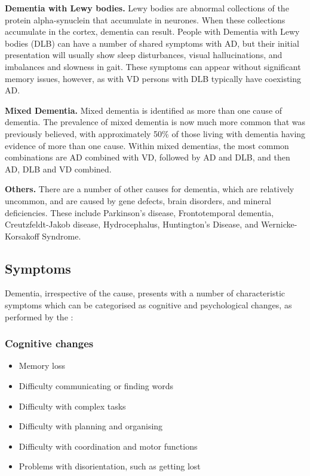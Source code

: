 \textbf{Dementia with Lewy bodies.}
Lewy bodies are abnormal collections of the protein alpha-synuclein that accumulate in neurones. When these collections accumulate in the cortex, dementia can result. People with Dementia with Lewy bodies (DLB) can have a number of shared symptoms with AD, but their initial presentation will usually show sleep disturbances, visual hallucinations, and imbalances and slowness in gait. These symptoms can appear without significant memory issues, however, as with VD persons with DLB typically have coexisting AD.

\textbf{Mixed Dementia.}
Mixed dementia is identified as more than one cause of dementia. The prevalence of mixed dementia is now much more common that was previously believed, with approximately 50\% of those living with dementia having evidence of more than one cause. Within mixed dementias, the most common combinations are AD combined with VD, followed by AD and DLB, and then AD, DLB and VD combined.

\textbf{Others.}
There are a number of other causes for dementia, which are relatively uncommon, and are caused by gene defects, brain disorders, and mineral deficiencies. These include Parkinson's disease, Frontotemporal dementia, Creutzfeldt-Jakob disease, Hydrocephalus, Huntington's Disease, and Wernicke-Korsakoff Syndrome.

\subsection{Symptoms}
Dementia, irrespective of the cause, presents with a number of characteristic symptoms \cite{NationalHealthService2015} which  can be categorised as cognitive and psychological changes, as performed by the \citeauthor{MayoFoundationforMedicalEducationandResearch2015} \cite{MayoFoundationforMedicalEducationandResearch2015}:

\subsubsection{Cognitive changes}
\begin{itemize}[noitemsep,topsep=0pt]
\item Memory loss
\item Difficulty communicating or finding words
\item Difficulty with complex tasks
\item Difficulty with planning and organising
\item Difficulty with coordination and motor functions
\item Problems with disorientation, such as getting lost
\end{itemize}

